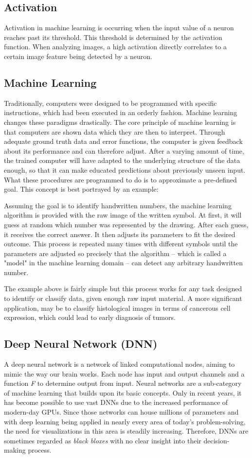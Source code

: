 \documentclass{acmsiggraph}               %
\begin{document}
\subsection{Activation}
Activation in machine learning is occurring when the input value of a neuron reaches past its threshold. This threshold is determined by the activation function. When analyzing images, a high activation directly correlates to a certain image feature being detected by a neuron.

\subsection{Machine Learning}
Traditionally, computers were designed to be programmed with specific instructions, which had been executed in an orderly fashion.
Machine learning changes these paradigms drastically. The core principle of machine learning is that computers are shown data which they are then to interpret. Through adequate ground truth data and error functions, the computer is given feedback about its performance and can therefore adjust. After a varying amount of time, the trained computer will have adapted to the underlying structure of the data enough, so that it can make educated predictions about previously unseen input. What these procedures are programmed to do is to approximate a pre-defined goal. This concept is best portrayed by an example:

Assuming the goal is to identify handwritten numbers, the machine learning algorithm is provided with the raw image of the written symbol. At first, it will guess at random which number was represented by the drawing. 
After each guess, it receives the correct answer. It then adjusts its parameters to fit the desired outcome.
This process is repeated many times with different symbols until the parameters are adjusted so precisely that the algorithm -- which is called a "model" in the machine learning domain -- can detect any arbitrary handwritten number.

The example above is fairly simple but this process works for any task designed to identify or classify data, given enough raw input material. A more significant application, may be to classify histological images in terms of cancerous cell expression, which could lead to early diagnosis of tumors.

\subsection{Deep Neural Network (DNN)}
A deep neural network is a network of linked computational nodes, aiming to mimic the way our brain works. Each node has input and output channels and a function \textit{F} to determine output from input. Neural networks are a sub-category of machine learning that builds upon its basic concepts. Only in recent years, it has become possible to use vast DNNs due to the increased performance of modern-day GPUs. Since those networks can house millions of parameters and with deep learning being applied in nearly every area of today's problem-solving, the need for visualizations in this area is steadily increasing. Therefore, DNNs are sometimes regarded as \textit{black bloxes} with no clear insight into their decision-making process.
\end{document}
